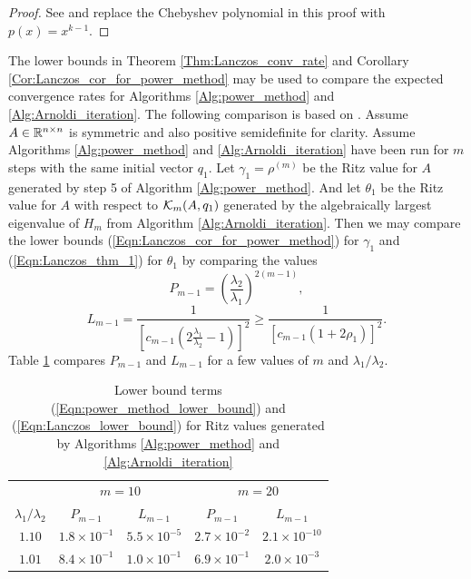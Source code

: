\begin{proof}
See \cite[Theorem 10.1.2]{golub2012matrix} and replace the Chebyshev polynomial in this proof with $p(x) = x^{k-1}$.
\end{proof}


The lower bounds in Theorem \ref{Thm:Lanczos_conv_rate} and Corollary \ref{Cor:Lanczos_cor_for_power_method} may be used to compare the expected convergence rates for Algorithms \ref{Alg:power_method} and \ref{Alg:Arnoldi_iteration}.  The following comparison is based on \cite[Section 10.1.6]{golub2012matrix}.  Assume $A \in {\mathbb R}^{n \times n}$ is symmetric and also positive semidefinite for clarity.  Assume Algorithms \ref{Alg:power_method} and \ref{Alg:Arnoldi_iteration} have been run for $m$ steps with the same initial vector $q_1$.  Let $\gamma_1 = \rho^{(m)}$ be the Ritz value for $A$ generated by step 5 of Algorithm \ref{Alg:power_method}.  And let $\theta_1$ be the Ritz value for $A$ with respect to ${\mathcal K}_m(A, q_1)$ generated by the algebraically largest eigenvalue of $H_m$ from Algorithm \ref{Alg:Arnoldi_iteration}.  Then we may compare the lower bounds (\ref{Eqn:Lanczos_cor_for_power_method}) for $\gamma_1$ and (\ref{Eqn:Lanczos_thm_1}) for $\theta_1$ by comparing the values
\begin{equation} 		\label{Eqn:power_method_lower_bound}
P_{m-1} = \left( \frac{\lambda_2}{\lambda_1} \right)^{2(m-1)},
\end{equation}
\begin{equation}  	\label{Eqn:Lanczos_lower_bound}
L_{m-1} 
	= \frac{1}{\left[c_{m-1}\left(2\frac{\lambda_1}{\lambda_2} -1 \right)\right]^2} 
	\geq 	\frac{1}{\left[ c_{m-1}\left( 1 + 2 \rho_1 \right) \right]^2}.
\end{equation}
Table \ref{Tab:Lanczos_vs_power_method} compares $P_{m-1}$ and $L_{m-1}$ for a few values of $m$ and $\lambda_1/\lambda_2$.

\begin{table}[H]
\centering
\begin{tabular}{ |c|cc|cc| }
 \hline

 	&	\multicolumn{2}{c|}{$m = 10$}
 		&	\multicolumn{2}{c|}{$m = 20$}	\\
 $\lambda_1 / \lambda_2$	&	$P_{m-1}$	&	$L_{m-1}$
 		&	$P_{m-1}$	&	$L_{m-1}$		\\ 			
 \hline
$1.10$
	&	$1.8 \times 10^{-1}$ & $5.5 \times 10^{-5}$
		&	$2.7 \times 10^{-2}$ & $2.1 \times 10^{-10}$	\\
$1.01$
	&	$8.4 \times 10^{-1}$ & $1.0 \times 10^{-1}$
		&	$6.9 \times 10^{-1}$ & $2.0 \times 10^{-3}$	\\
 \hline
\end{tabular}
\caption{Lower bound terms (\ref{Eqn:power_method_lower_bound}) and (\ref{Eqn:Lanczos_lower_bound}) for Ritz values generated by Algorithms \ref{Alg:power_method} and \ref{Alg:Arnoldi_iteration} } \label{Tab:Lanczos_vs_power_method}
\end{table}

